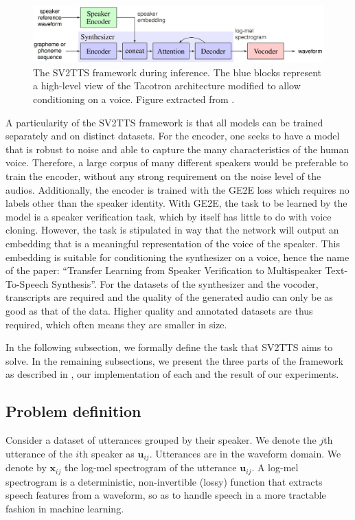 \documentclass[a4paper, oneside, 12pt, english]{article}
\begin{document}
\begin{figure}[h]
	\centering
	\includegraphics[width=\linewidth]{images/sv2tts_framework.jpg}
	\caption{The SV2TTS framework during inference. The blue blocks represent a high-level view of the Tacotron architecture modified to allow conditioning on a voice. Figure extracted from \citep{SV2TTS}.}
	\label{sv2tts_framework}
\end{figure}

A particularity of the SV2TTS framework is that all models can be trained separately and on distinct datasets. For the encoder, one seeks to have a model that is robust to noise and able to capture the many characteristics of the human voice. Therefore, a large corpus of many different speakers would be preferable to train the encoder, without any strong requirement on the noise level of the audios. Additionally, the encoder is trained with the GE2E loss which requires no labels other than the speaker identity. With GE2E, the task to be learned by the model is a speaker verification task, which by itself has little to do with voice cloning. However, the task is stipulated in way that the network will output an embedding that is a meaningful representation of the voice of the speaker. This embedding is suitable for conditioning the synthesizer on a voice, hence the name of the paper: ``Transfer Learning from Speaker Verification to Multispeaker Text-To-Speech Synthesis''. For the datasets of the synthesizer and the vocoder, transcripts are required and the quality of the generated audio can only be as good as that of the data. Higher quality and annotated datasets are thus required, which often means they are smaller in size.

In the following subsection, we formally define the task that SV2TTS aims to solve. In the remaining subsections, we present the three parts of the framework as described in \citep{SV2TTS}, our implementation of each and the result of our experiments.

\subsection{Problem definition} \label{problem_definition}
\newcommand{\vx}{\mathbf{x}}
\newcommand{\vu}{\mathbf{u}}
\newcommand{\ve}{\mathbf{e}}
\newcommand{\vt}{\mathbf{t}}
\newcommand{\vc}{\mathbf{c}}
\newcommand{\vw}{\mathbf{w}}
\newcommand{\ms}{\mathbf{S}}
\newcommand{\enc}{\mathcal{E}}
\newcommand{\syn}{\mathcal{S}}
\newcommand{\voc}{\mathcal{V}}
Consider a dataset of utterances grouped by their speaker. We denote the $j$th utterance of the $i$th speaker as $\vu_{ij}$. Utterances are in the waveform domain. We denote by $\vx_{ij}$ the log-mel spectrogram of the utterance $\vu_{ij}$. A log-mel spectrogram is a deterministic, non-invertible (lossy) function that extracts speech features from a waveform, so as to handle speech in a more tractable fashion in machine learning.
\end{document}
